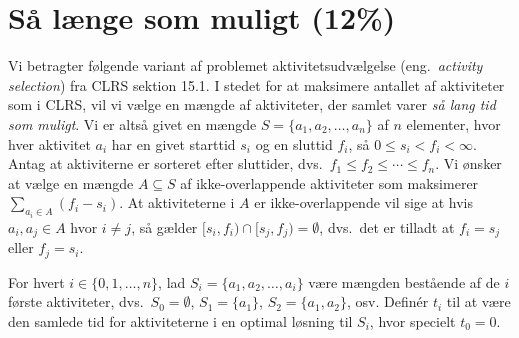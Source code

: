 \section{Så længe som muligt (12\%)}

Vi betragter følgende variant af problemet aktivitetsudvælgelse (eng.~\emph{activity selection}) fra CLRS sektion 15.1.
I stedet for at maksimere antallet af aktiviteter som i CLRS, vil vi vælge en mængde af aktiviteter, der samlet varer \emph{så lang tid som muligt}.
Vi er altså givet en mængde $S=\{a_1,a_2,\ldots,a_n\}$ af $n$ elementer, hvor hver aktivitet $a_i$ har en givet starttid $s_i$ og en sluttid $f_i$, så $0\leq s_i<f_i<\infty$.
Antag at aktiviterne er sorteret efter sluttider, dvs.~$f_1\leq f_2\leq\cdots\leq f_n$.
Vi ønsker at vælge en mængde $A\subseteq S$ af ikke-overlappende aktiviteter som maksimerer $\sum_{a_i\in A} (f_i-s_i)$.
At aktiviteterne i $A$ er ikke-overlappende vil sige at hvis $a_i,a_j\in A$ hvor $i\neq j$, så gælder $[s_i,f_i)\cap [s_j,f_j)=\emptyset$, dvs.~det er tilladt at $f_i = s_j$ eller $f_j = s_i$.



For hvert $i\in\{0, 1,\ldots,n\}$, lad $S_i=\{a_1,a_2,\ldots,a_i\}$ være mængden bestående af de $i$ første aktiviteter, dvs.~$S_0=\emptyset$, $S_1=\{a_1\}$, $S_2=\{a_1, a_2\}$, osv.
Definér $t_i$ til at være den samlede tid for aktiviteterne i en optimal løsning til $S_i$, hvor specielt $t_0=0$.



